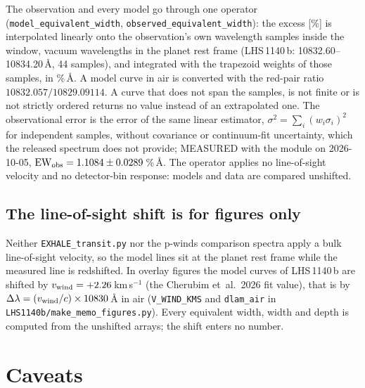 \documentclass[english,a4paper]{my_memo}
\begin{document}
\begin{sloppypar}
The observation and every model go through one operator
(\texttt{model\_equivalent\_width}, \texttt{observed\_equivalent\_width}):
the excess [\%] is interpolated linearly onto the observation's own
wavelength samples inside the window, vacuum wavelengths in the planet rest
frame (LHS\,1140\,b: 10832.60--10834.20\,\AA{}, 44 samples), and integrated
with the trapezoid weights of those samples, in \%\,\AA{}. A model curve in
air is converted with the red-pair ratio $10832.057/10829.09114$. A curve that
does not span the samples, is not finite or is not strictly ordered returns
no value instead of an extrapolated one. The observational error is the
error of the same linear estimator, $\sigma^2 = \sum_i (w_i\sigma_i)^2$ for
independent samples, without covariance or continuum-fit uncertainty, which
the released spectrum does not provide; MEASURED with the module on
2026-10-05, $\mathrm{EW}_{\rm obs} = 1.1084 \pm 0.0289$\,\%\,\AA{}. The
operator applies no line-of-sight velocity and no detector-bin response:
models and data are compared unshifted.
\end{sloppypar}

\subsection{The line-of-sight shift is for figures only}
\label{sec:vwindoverlay}

Neither \texttt{EXHALE\_transit.py} nor the p-winds comparison spectra apply
a bulk line-of-sight velocity, so the model lines sit at the planet rest
frame while the measured line is redshifted. In overlay figures the model
curves of LHS\,1140\,b are shifted by $v_{\rm wind} = +2.26$\,km\,s$^{-1}$
(the Cherubim et~al.\ 2026 fit value), that is by
$\Delta\lambda = (v_{\rm wind}/c)\times10830$\,\AA{} in air
(\texttt{V\_WIND\_KMS} and \texttt{dlam\_air} in
\texttt{LHS1140b/make\_memo\_figures.py}).
Every equivalent width, width and depth is computed from the unshifted
arrays; the shift enters no number.

\section{Caveats}
\end{document}
